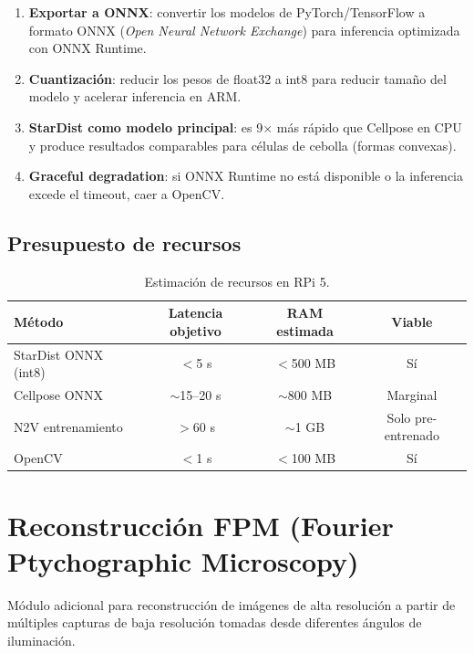 \documentclass[11pt,a4paper]{article}
\begin{document}
\begin{enumerate}
  \item \textbf{Exportar a ONNX}: convertir los modelos de PyTorch/TensorFlow a formato ONNX (\textit{Open Neural Network Exchange}) para inferencia optimizada con ONNX Runtime.
  \item \textbf{Cuantizaci\'{o}n}: reducir los pesos de float32 a int8 para reducir tama\~{n}o del modelo y acelerar inferencia en ARM.
  \item \textbf{StarDist como modelo principal}: es 9$\times$ m\'{a}s r\'{a}pido que Cellpose en CPU y produce resultados comparables para c\'{e}lulas de cebolla (formas convexas).
  \item \textbf{Graceful degradation}: si ONNX Runtime no est\'{a} disponible o la inferencia excede el timeout, caer a OpenCV.
\end{enumerate}

\subsection{Presupuesto de recursos}

\begin{table}[H]
\centering
\begin{tabular}{lccc}
\toprule
\textbf{M\'{e}todo} & \textbf{Latencia objetivo} & \textbf{RAM estimada} & \textbf{Viable} \\
\midrule
StarDist ONNX (int8) & $<$5 s & $<$500 MB & S\'{i} \\
Cellpose ONNX & $\sim$15--20 s & $\sim$800 MB & Marginal \\
N2V entrenamiento & $>$60 s & $\sim$1 GB & Solo pre-entrenado \\
OpenCV & $<$1 s & $<$100 MB & S\'{i} \\
\bottomrule
\end{tabular}
\caption{Estimaci\'{o}n de recursos en RPi 5.}
\end{table}

\section{Reconstrucci\'{o}n FPM (Fourier Ptychographic Microscopy)}

M\'{o}dulo adicional para reconstrucci\'{o}n de im\'{a}genes de alta resoluci\'{o}n a partir de m\'{u}ltiples capturas de baja resoluci\'{o}n tomadas desde diferentes \'{a}ngulos de iluminaci\'{o}n.
\end{document}
